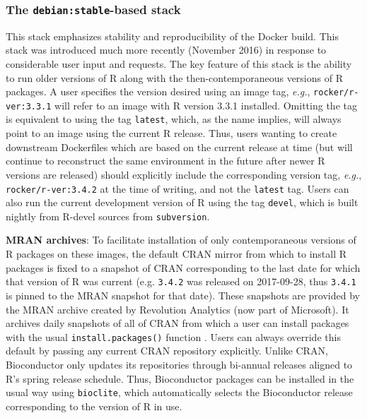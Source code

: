 \subsubsection{\texorpdfstring{The \texttt{debian:stable}-based
stack}{The debian:stable-based stack}}\label{the-debianstable-based-stack}

This stack emphasizes stability and reproducibility of the Docker build.
This stack was introduced much more recently (November 2016) in response
to considerable user input and requests. The key feature of this stack
is the ability to run older versions of R along with the
then-contemporaneous versions of R packages. A user specifies the
version desired using an image tag, \emph{e.g.},
\texttt{rocker/r-ver:3.3.1} will refer to an image with R version 3.3.1
installed. Omitting the tag is equivalent to using the tag
\texttt{latest}, which, as the name implies, will always point to an
image using the current R release. Thus, users wanting to create
downstream Dockerfiles which are based on the current release at time
(but will continue to reconstruct the same environment in the future
after newer R versions are released) should explicitly include the
corresponding version tag, \emph{e.g.}, \texttt{rocker/r-ver:3.4.2} at
the time of writing, and not the \texttt{latest} tag. Users can also run
the current development version of R using the tag \texttt{devel}, which
is built nightly from R-devel sources from \texttt{subversion}.

\textbf{MRAN archives}: To facilitate installation of only
contemporaneous versions of R packages on these images, the default CRAN
mirror from which to install R packages is fixed to a snapshot of CRAN
corresponding to the last date for which that version of R was current
(e.g. \texttt{3.4.2} was released on 2017-09-28, thus \texttt{3.4.1} is
pinned to the MRAN snapshot for that date). These snapshots are provided
by the MRAN archive created by Revolution Analytics (now part of
Microsoft). It archives daily snapshots of all of CRAN from which a user
can install packages with the usual \texttt{install.packages()} function
\citep{MRAN}. Users can always override this default by passing any
current CRAN repository explicitly. Unlike CRAN, Bioconductor only
updates its repositories through bi-annual releases aligned to R's
spring release schedule. Thus, Bioconductor packages can be installed in
the usual way using \texttt{bioclite}, which automatically selects the
Bioconductor release corresponding to the version of R in use.

